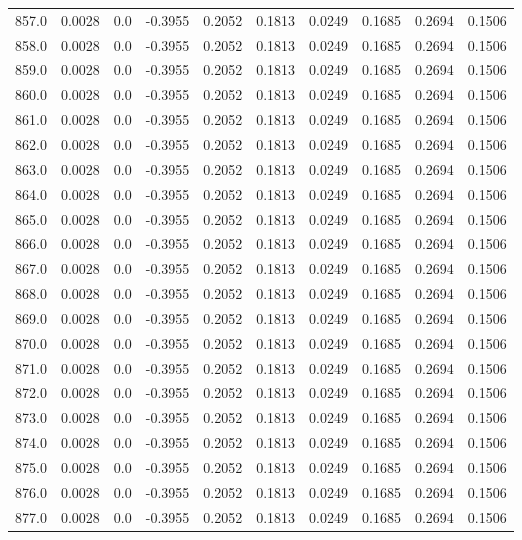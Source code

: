 \begin{longtable}{lrrrrrrrrr}
857.0 & 0.0028 & 0.0 & -0.3955 & 0.2052 & 0.1813 & 0.0249 & 0.1685 & 0.2694 & 0.1506 \\
858.0 & 0.0028 & 0.0 & -0.3955 & 0.2052 & 0.1813 & 0.0249 & 0.1685 & 0.2694 & 0.1506 \\
859.0 & 0.0028 & 0.0 & -0.3955 & 0.2052 & 0.1813 & 0.0249 & 0.1685 & 0.2694 & 0.1506 \\
860.0 & 0.0028 & 0.0 & -0.3955 & 0.2052 & 0.1813 & 0.0249 & 0.1685 & 0.2694 & 0.1506 \\
861.0 & 0.0028 & 0.0 & -0.3955 & 0.2052 & 0.1813 & 0.0249 & 0.1685 & 0.2694 & 0.1506 \\
862.0 & 0.0028 & 0.0 & -0.3955 & 0.2052 & 0.1813 & 0.0249 & 0.1685 & 0.2694 & 0.1506 \\
863.0 & 0.0028 & 0.0 & -0.3955 & 0.2052 & 0.1813 & 0.0249 & 0.1685 & 0.2694 & 0.1506 \\
864.0 & 0.0028 & 0.0 & -0.3955 & 0.2052 & 0.1813 & 0.0249 & 0.1685 & 0.2694 & 0.1506 \\
865.0 & 0.0028 & 0.0 & -0.3955 & 0.2052 & 0.1813 & 0.0249 & 0.1685 & 0.2694 & 0.1506 \\
866.0 & 0.0028 & 0.0 & -0.3955 & 0.2052 & 0.1813 & 0.0249 & 0.1685 & 0.2694 & 0.1506 \\
867.0 & 0.0028 & 0.0 & -0.3955 & 0.2052 & 0.1813 & 0.0249 & 0.1685 & 0.2694 & 0.1506 \\
868.0 & 0.0028 & 0.0 & -0.3955 & 0.2052 & 0.1813 & 0.0249 & 0.1685 & 0.2694 & 0.1506 \\
869.0 & 0.0028 & 0.0 & -0.3955 & 0.2052 & 0.1813 & 0.0249 & 0.1685 & 0.2694 & 0.1506 \\
870.0 & 0.0028 & 0.0 & -0.3955 & 0.2052 & 0.1813 & 0.0249 & 0.1685 & 0.2694 & 0.1506 \\
871.0 & 0.0028 & 0.0 & -0.3955 & 0.2052 & 0.1813 & 0.0249 & 0.1685 & 0.2694 & 0.1506 \\
872.0 & 0.0028 & 0.0 & -0.3955 & 0.2052 & 0.1813 & 0.0249 & 0.1685 & 0.2694 & 0.1506 \\
873.0 & 0.0028 & 0.0 & -0.3955 & 0.2052 & 0.1813 & 0.0249 & 0.1685 & 0.2694 & 0.1506 \\
874.0 & 0.0028 & 0.0 & -0.3955 & 0.2052 & 0.1813 & 0.0249 & 0.1685 & 0.2694 & 0.1506 \\
875.0 & 0.0028 & 0.0 & -0.3955 & 0.2052 & 0.1813 & 0.0249 & 0.1685 & 0.2694 & 0.1506 \\
876.0 & 0.0028 & 0.0 & -0.3955 & 0.2052 & 0.1813 & 0.0249 & 0.1685 & 0.2694 & 0.1506 \\
877.0 & 0.0028 & 0.0 & -0.3955 & 0.2052 & 0.1813 & 0.0249 & 0.1685 & 0.2694 & 0.1506 \\

\end{longtable}
